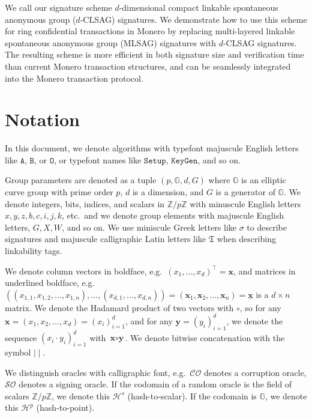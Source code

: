 \documentclass{mrl}
\theoremstyle{plain}
\theoremstyle{definition}
\begin{document}
We call our signature scheme $d$-dimensional compact linkable spontaneous anonymous group ($d$-CLSAG) signatures. We demonstrate how to use this scheme for ring confidential transactions in Monero by replacing multi-layered linkable spontaneous anonymous group (MLSAG) signatures with $d$-CLSAG signatures.  The resulting scheme is more efficient in both signature size and verification time than current Monero transaction structures, and can be seamlessly integrated into the Monero transaction protocol.


\section{Notation}

In this document, we denote algorithms with typefont majuscule English letters like $\texttt{A}$, $\texttt{B}$, or $\texttt{O}$, or typefont names like $\texttt{Setup}$, $\texttt{KeyGen}$, and so on.  

Group parameters are denoted as a tuple $(p, \mathbb{G}, d, G)$ where $\mathbb{G}$ is an elliptic curve group with prime order $p$, $d$ is a dimension, and $G$ is a generator of $\mathbb{G}$. We denote integers, bits, indices, and scalars in $\mathbb{Z}/p\mathbb{Z}$ with minuscule English letters $x, y, z, b, c, i, j, k$, etc.\ and we denote group elements with majuscule English letters, $G, X, W$, and so on. We use miniscule Greek letters like $\sigma$ to describe signatures and majuscule calligraphic Latin letters like $\mathfrak{T}$ when describing linkability tags.

We denote column vectors in boldface, e.g.\ $(x_1, \ldots, x_d)^\top = \textbf{x}$, and matrices in underlined boldface, e.g.\ $((x_{1,1}, x_{1,2}, \ldots, x_{1,n}), \ldots, (x_{d,1}, \ldots, x_{d,n})) = (\textbf{x}_1, \textbf{x}_2, \ldots, \textbf{x}_n) = \underline{\textbf{x}}$ is a $d\times n$ matrix. We denote the Hadamard product of two vectors with $\circ$, so for any $\textbf{x} = (x_1, x_2, \ldots, x_d) = (x_i)_{i=1}^{d}$, and for any $\textbf{y} = (y_i)_{i=1}^{d}$, we denote the sequence $(x_i \cdot y_i)_{i=1}^{d}$ with $\textbf{x} \circ \textbf{y}$. We denote bitwise concatenation with the symbol $\mid \mid$.

We distinguish oracles with calligraphic font, e.g.\ $\mathcal{CO}$ denotes a corruption oracle, $\mathcal{SO}$ denotes a signing oracle. If the codomain of a random oracle is the field of scalars $\mathbb{Z}/p\mathbb{Z}$, we denote this $\mathcal{H}^s$ (hash-to-scalar). If the codomain is $\mathbb{G}$, we denote this $\mathcal{H}^p$ (hash-to-point).
\end{document}
